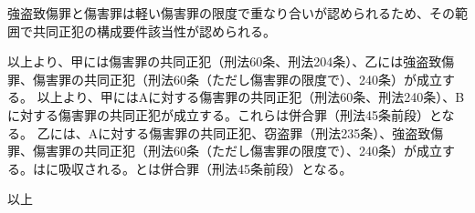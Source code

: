 \documentclass[11pt]{jsarticle}
\begin{document}
		強盗致傷罪と傷害罪は軽い傷害罪の限度で重なり合いが認められるため、その範囲で共同正犯の構成要件該当性が認められる。
		
		以上より、甲には傷害罪の共同正犯（刑法60条、刑法204条）、乙には強盗致傷罪、傷害罪の共同正犯（刑法60条（ただし傷害罪の限度で）、240条）が成立する。
	\sectionB{}
		以上より、甲にはAに対する傷害罪の共同正犯（刑法60条、刑法240条）、Bに対する傷害罪の共同正犯が成立する。これらは併合罪（刑法45条前段）となる。
	\sectionB{}
		乙には、Aに対する傷害罪の共同正犯、窃盗罪（刑法235条）、強盗致傷罪、傷害罪の共同正犯（刑法60条（ただし傷害罪の限度で）、240条）が成立する。はに吸収される。とは併合罪（刑法45条前段）となる。
	
\begin{flushright}
	以上
\end{flushright}
	
\end{document}
